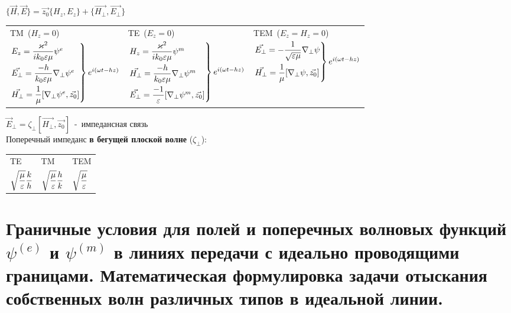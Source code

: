 \begin{multicols*}{2}
		$\{\vec{H},\vec{E}\}=\vec{z_0}\{{H_z},{E_z}\}+\{\vec{H_\perp},\vec{E_\perp}\}$ \\
		\begin{tabular}{l l l}
			TM~($H_z=0$) & TE~($E_z=0$) & TEM~($E_z=H_z=0$) \\
			$\begin{rcases}
				E_z=\dfrac{\varkappa^2}{ik_0\varepsilon\mu}\psi^e \\
				\vec{E_\perp} = \dfrac{-h}{k_0\varepsilon\mu}\nabla_\perp\psi^e \\
				\vec{H_\perp}=\dfrac1{\mu}[\nabla_\perp\psi^e,\vec{z_0}]
			\end{rcases} e^{i(\omega t-hz)}$ & 
			$\begin{rcases}
				H_z=\dfrac{\varkappa^2}{ik_0\varepsilon\mu}\psi^m \\
				\vec{H_\perp} = \dfrac{-h}{k_0\varepsilon\mu}\nabla_\perp\psi^m \\
				\vec{E_\perp}=\dfrac{-1}{\varepsilon}[\nabla_\perp\psi^m,\vec{z_0}]
			\end{rcases} e^{i(\omega t-hz)}$ & 
			$\begin{rcases}
				\vec{E_\perp} =-\dfrac1{\sqrt{\varepsilon\mu}}\nabla_\perp\psi \\
				\vec{H_\perp}=\dfrac1{\mu}[\nabla_\perp\psi,\vec{z_0}]
			\end{rcases} e^{i(\omega t-hz)}$ \\
		\end{tabular}
		$\vec{E}_\perp=\zeta_\perp[\vec{H_\perp},\vec{z_0}]$~-~импедансная связь \\
		Поперечный импеданс \textbf{в бегущей плоской волне} ($\zeta_\perp$): \\
		\begin{tabular}{l l l}
			TE & TM & TEM \\
			$\sqrt{\dfrac{\mu}{\varepsilon}}\dfrac kh$ & $\sqrt{\dfrac{\mu}{\varepsilon}}\dfrac hk$ & $\sqrt{\dfrac{\mu}{\varepsilon}}$ \\
		\end{tabular}
		
		\section{Граничные условия для полей и поперечных волновых функций $\psi^{(e)}$ и $\psi^{(m)}$ в линиях передачи с идеально проводящими границами. Математическая формулировка задачи отыскания собственных волн различных типов в идеальной линии.}
		

\end{multicols*}
